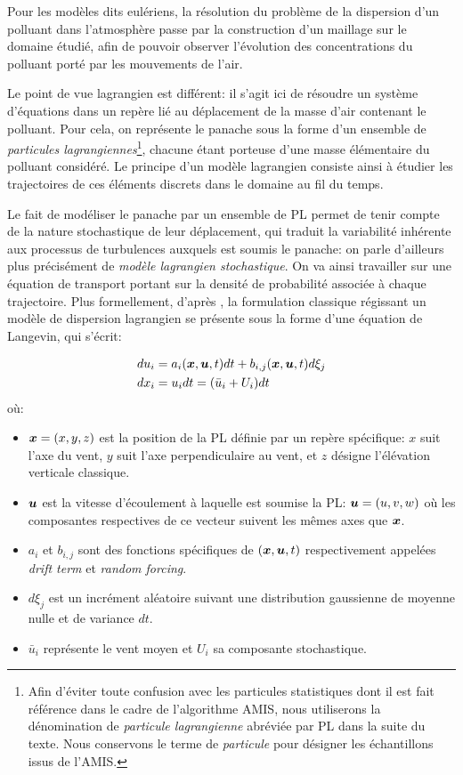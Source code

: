Pour les modèles dits eulériens, la résolution du problème de la dispersion d'un polluant dans l'atmosphère passe par la construction d'un maillage sur le domaine étudié, afin de pouvoir observer l'évolution des concentrations du polluant porté par les mouvements de l'air. 

Le point de vue lagrangien est différent: il s'agit ici de résoudre un système d'équations dans un repère lié au déplacement de la masse d'air contenant le polluant. Pour cela, on représente le panache sous la forme d'un ensemble de \textit{particules lagrangiennes}\footnote{Afin d'éviter toute confusion avec les particules statistiques dont il est fait référence dans le cadre de l'algorithme AMIS, nous utiliserons la dénomination  de \textit{particule lagrangienne} abréviée par PL dans la suite du texte. Nous conservons le terme de \textit{particule} pour désigner les échantillons issus de l'AMIS.}, chacune étant porteuse d'une masse élémentaire du polluant considéré. Le principe d'un modèle lagrangien consiste ainsi à étudier les trajectoires de ces éléments discrets dans le domaine au fil du temps.

Le fait de modéliser le panache par un ensemble de PL permet de tenir compte de la nature stochastique de leur déplacement, qui traduit la variabilité inhérente aux processus de turbulences auxquels est soumis le panache: on parle d'ailleurs plus précisément de \textit{modèle lagrangien stochastique}. On va ainsi travailler sur une équation de transport portant sur la densité de probabilité associée à chaque trajectoire. Plus formellement, d'après \cite{Flesch1995}, la formulation classique régissant un modèle de dispersion lagrangien se présente sous la forme d'une équation de Langevin, qui s'écrit: 

\begin{equation}
	\begin{split}
		du_i &= a_i({\bm{x}}, {\bm{u}}, t)dt + b_{i,j}({\bm{x}}, {\bm{u}}, t)d\xi_j  \\
		dx_i &= u_i dt = (\bar{u}_i + U_i)dt
	\end{split}
	\label{eq_langevin}
\end{equation}
où:
 \begin{itemize}
	\item ${\bm{x}} = (x, y, z)$ est la position de la PL  définie par un repère spécifique: $x$ suit l'axe du vent, $y$ suit l'axe perpendiculaire au vent, et $z$ désigne l'élévation verticale classique. 
	\item ${\bm{u}}$ est la vitesse d'écoulement à laquelle est soumise la PL: ${\bm{u}} = (u, v, w)$ où les composantes respectives de ce vecteur suivent les mêmes axes que ${\bm{x}}$.
	\item $a_i$ et $b_{i,j}$ sont des fonctions spécifiques de $({\bm{x}}, {\bm{u}}, t)$ respectivement appelées \textit{drift term} et \textit{random forcing}.
	\item $d\xi_j$ est un incrément aléatoire suivant une distribution gaussienne de moyenne nulle et de variance $dt$.
	\item $\bar{u}_i$ représente le vent moyen et $U_i$ sa composante stochastique.
	
\end{itemize}

